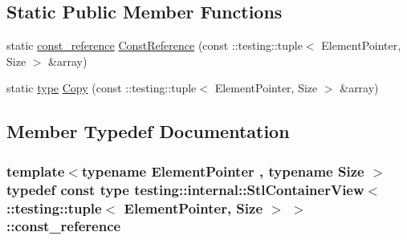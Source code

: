\subsection*{Static Public Member Functions}
\begin{DoxyCompactItemize}
\item 
static \hyperlink{classtesting_1_1internal_1_1StlContainerView_3_01_1_1testing_1_1tuple_3_01ElementPointer_00_01Size_01_4_01_4_a4c69a4e22173b0e6f3eb55636d6a38f1}{const\+\_\+reference} \hyperlink{classtesting_1_1internal_1_1StlContainerView_3_01_1_1testing_1_1tuple_3_01ElementPointer_00_01Size_01_4_01_4_aba9be6fade312dd735ac47a3cb8cc355}{Const\+Reference} (const \+::testing\+::tuple$<$ Element\+Pointer, Size $>$ \&array)
\item 
static \hyperlink{classtesting_1_1internal_1_1StlContainerView_3_01_1_1testing_1_1tuple_3_01ElementPointer_00_01Size_01_4_01_4_aedefb897170f76518afbca6f87b5467c}{type} \hyperlink{classtesting_1_1internal_1_1StlContainerView_3_01_1_1testing_1_1tuple_3_01ElementPointer_00_01Size_01_4_01_4_a3d42db21a2f88d407a4b5acbb7fe252c}{Copy} (const \+::testing\+::tuple$<$ Element\+Pointer, Size $>$ \&array)
\end{DoxyCompactItemize}


\subsection{Member Typedef Documentation}
\subsubsection[{\texorpdfstring{const\+\_\+reference}{const_reference}}]{\setlength{\rightskip}{0pt plus 5cm}template$<$typename Element\+Pointer , typename Size $>$ typedef const {\bf type} {\bf testing\+::internal\+::\+Stl\+Container\+View}$<$ \+::testing\+::tuple$<$ Element\+Pointer, Size $>$ $>$\+::{\bf const\+\_\+reference}}\hypertarget{classtesting_1_1internal_1_1StlContainerView_3_01_1_1testing_1_1tuple_3_01ElementPointer_00_01Size_01_4_01_4_a4c69a4e22173b0e6f3eb55636d6a38f1}{}\label{classtesting_1_1internal_1_1StlContainerView_3_01_1_1testing_1_1tuple_3_01ElementPointer_00_01Size_01_4_01_4_a4c69a4e22173b0e6f3eb55636d6a38f1}
